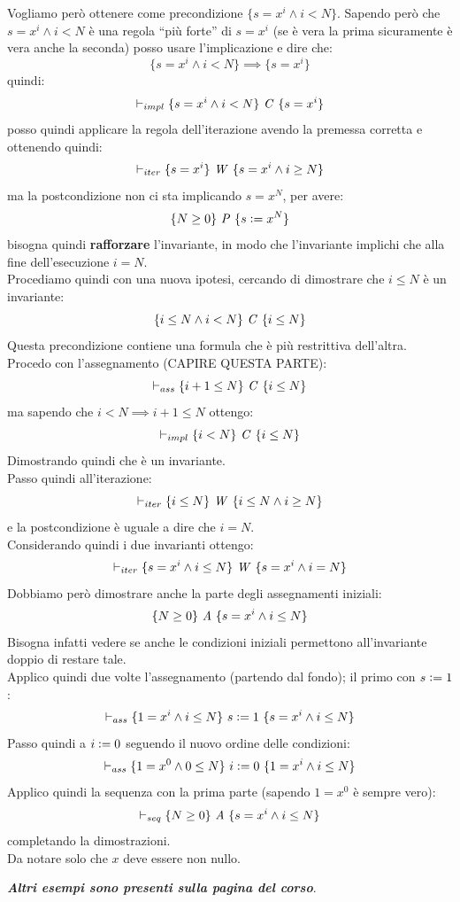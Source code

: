 \documentclass[a4paper,12pt, oneside]{book}
\def\cceq{\mathrel{\vcenter{\hbox{:}}{=}}}
\begin{document}
\begin{esempio}
  Vogliamo però ottenere come precondizione $\{s=x^i\land i<N\}$. Sapendo però
  che $s= x^i\land i<N$ è una regola ``più forte'' di $s= x^i$ (se è vera la
  prima sicuramente è vera anche la seconda) posso usare
  l'implicazione e dire che:
  \[\{s=x^i\land i<N\}\implies \{s= x^i\}\]
  quindi:
  \[\vdash_{impl} \{s=x^i\land i<N\}\mbox{ \textit{C} }\{s=x^i\}\]
  posso quindi applicare la regola dell'iterazione avendo la premessa corretta e
  ottenendo quindi:
  \[\vdash_{iter}\{s=x^i\}\mbox{ \textit{W} }\{s=x^i\land i\geq N\}\]
  ma la postcondizione non ci sta implicando $s=x^N$, per avere:
  \[\{N\geq 0\}\mbox{ \textit{P} }\{s\cceq x^N\}\]
  bisogna quindi \textbf{rafforzare} l'invariante, in modo che l'invariante
  implichi che alla fine dell'esecuzione $i=N$.\\
  Procediamo quindi con una nuova ipotesi, cercando di dimostrare che $i\leq N$
  è un invariante:
  \[\{i\leq N\land i<N\}\mbox{ \textit{C} }\{i\leq N\}\]
  Questa precondizione contiene una formula che è più restrittiva dell'altra.
  Procedo con l'assegnamento (CAPIRE QUESTA PARTE):
  \[\vdash_{ass}\{i+1\leq N\}\mbox{ \textit{C} }\{i\leq N\}\]
  ma sapendo che $i<N\implies i+1\leq N$ ottengo:
  \[\vdash_{impl}\{i< N\}\mbox{ \textit{C} }\{i\leq N\}\]
  Dimostrando quindi che è un invariante.\\
  Passo quindi all'iterazione:
  \[\vdash_{iter}\{i\leq N\}\mbox{ \textit{W} }\{i\leq N\land i\geq N\}\]
  e la postcondizione è uguale a dire che $i=N$.\\
  Considerando quindi i due invarianti ottengo:
  \[\vdash_{iter}\{s=x^i\land i\leq N\}\mbox{ \textit{W} }
    \{s=x^i\land i= N\}\]
  Dobbiamo però dimostrare anche la parte degli assegnamenti iniziali:
  \[\{N\geq 0\}\mbox{ \textit{A} }\{s=x^i\land i\leq N\}\]
  Bisogna infatti vedere se anche le condizioni iniziali permettono
  all'invariante doppio di restare tale.\\
  Applico quindi due volte l'assegnamento (partendo dal fondo); il primo con
  $s\cceq 1$: 
  \[\vdash_{ass}\{1=x^i\land i\leq N\}\mbox{ $s\cceq 1$ }\{s=x^i\land i\leq N\}\]
  Passo quindi a $i\cceq 0$ seguendo il nuovo ordine delle condizioni:
  \[\vdash_{ass}\{1=x^0\land 0\leq N\}\mbox{ $i\cceq 0$ }\{1=x^i\land i\leq N\}\]
  Applico quindi la sequenza con la prima parte (sapendo $1=x^0$ è sempre vero):
  \[\vdash_{seq}\{N\geq 0\}\mbox{ \textit{A} }\{s=x^i\land i\leq N\}\]
  completando la dimostrazioni.\\
  Da notare solo che $x$ deve essere non nullo.
\end{esempio}
\textbf{\textit{Altri esempi sono presenti sulla pagina del corso}}.\\
\end{document}
